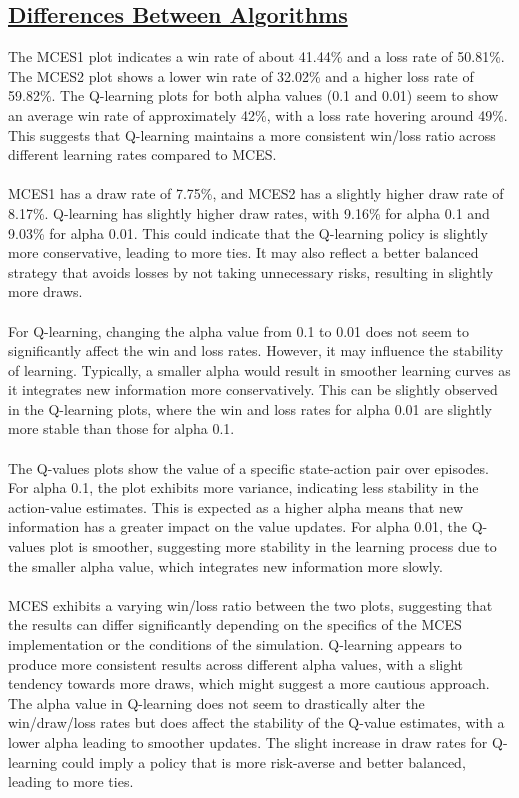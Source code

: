 \documentclass{article}
\begin{document}
\subsection*{\underline{Differences Between Algorithms}}
The MCES1 plot indicates a win rate of about 41.44\% and a loss rate of 50.81\%. 
The MCES2 plot shows a lower win rate of 32.02\% and a higher loss rate of 59.82\%.
The Q-learning plots for both alpha values (0.1 and 0.01) seem to show an average win rate of approximately 42\%, with a loss rate hovering around 49\%. 
This suggests that Q-learning maintains a more consistent win/loss ratio across different learning rates compared to MCES.
\hfill\\\\
MCES1 has a draw rate of 7.75\%, and MCES2 has a slightly higher draw rate of 8.17\%.
Q-learning has slightly higher draw rates, with 9.16\% for alpha 0.1 and 9.03\% for alpha 0.01. 
This could indicate that the Q-learning policy is slightly more conservative, leading to more ties. 
It may also reflect a better balanced strategy that avoids losses by not taking unnecessary risks, resulting in slightly more draws.
\hfill\\\\
For Q-learning, changing the alpha value from 0.1 to 0.01 does not seem to significantly affect the win and loss rates.
However, it may influence the stability of learning. 
Typically, a smaller alpha would result in smoother learning curves as it integrates new information more conservatively.
This can be slightly observed in the Q-learning plots, where the win and loss rates for alpha 0.01 are slightly more stable than those for alpha 0.1.
\hfill\\\\
The Q-values plots show the value of a specific state-action pair over episodes. For alpha 0.1, the plot exhibits more variance, indicating less stability in the action-value estimates. This is expected as a higher alpha means that new information has a greater impact on the value updates.
For alpha 0.01, the Q-values plot is smoother, suggesting more stability in the learning process due to the smaller alpha value, which integrates new information more slowly.
\hfill\\\\
MCES exhibits a varying win/loss ratio between the two plots, suggesting that the results can differ significantly depending on the specifics of the MCES implementation or the conditions of the simulation.
Q-learning appears to produce more consistent results across different alpha values, with a slight tendency towards more draws, which might suggest a more cautious approach.
The alpha value in Q-learning does not seem to drastically alter the win/draw/loss rates but does affect the stability of the Q-value estimates, with a lower alpha leading to smoother updates.
The slight increase in draw rates for Q-learning could imply a policy that is more risk-averse and better balanced, leading to more ties.
\end{document}
